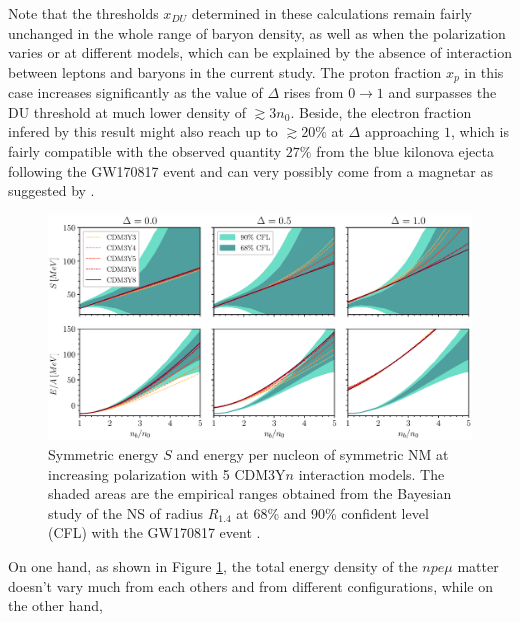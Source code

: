 Note that the thresholds $x_{DU}$ determined in these calculations remain fairly unchanged in the whole range of baryon density, as well as when the polarization varies or at different models, which can be explained by the absence of interaction between leptons and baryons in the current study. The proton fraction $x_p$ in this case increases significantly as the value of $\Delta$ rises from $0\to 1$ and surpasses the \gls{DU} threshold at much lower density of $\gtrsim 3n_0$. Beside, the electron fraction infered by this result might also reach up to $\gtrsim 20\%$ at $\Delta$ approaching $1$, which is fairly compatible with the observed quantity $27\%$ from the blue kilonova ejecta following the GW170817 event \citep{abbott2017gw170817, evans2017swift} and can very possibly come from a magnetar as suggested by \cite{metzger2018magnetar}.\par
\begin{figure}[ht!]
        \centering
        \includegraphics[width=\textwidth]{fig/symmetric.eps}
        \caption{Symmetric energy $S$ and energy per nucleon of symmetric \gls{NM} at increasing polarization with 5 CDM3Y$n$ interaction models. The shaded areas are the empirical ranges obtained from the Bayesian study \citep{xie2019bayesian} of the \gls{NS} of radius $R_{1.4}$ at 68\% and 90\% confident level (\gls{CFL}) with the GW170817 event \citep{abbott2018gw170817}.}
        \label{fig:s}
\end{figure} 
On one hand, as shown in Figure \ref{fig:s}, the total energy density of the $npe\mu$ matter doesn't vary much from each others and from different configurations, while on the other hand, 
